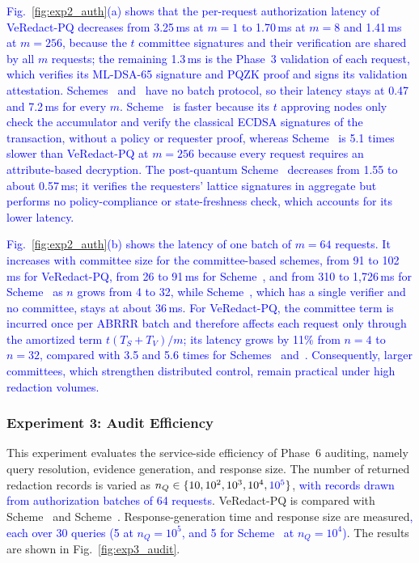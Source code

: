 \documentclass[lettersize,journal]{IEEEtran}
\newcommand{\chg}[1]{\textcolor{blue}{#1}}
\begin{document}
    \chg{Fig.~\ref{fig:exp2_auth}(a) shows that the per-request
    authorization latency of VeRedact-PQ decreases from 3.25\,ms at $m=1$
    to 1.70\,ms at $m=8$ and 1.41\,ms at $m=256$, because the $t$ committee
    signatures and their verification are shared by all $m$ requests; the
    remaining 1.3\,ms is the Phase~3 validation of each request, which
    verifies its ML-DSA-65 signature and PQZK proof and signs its validation
    attestation. Schemes~\cite{ref1} and~\cite{ref34} have no batch
    protocol, so their latency stays at 0.47 and 7.2\,ms for every $m$.
    Scheme~\cite{ref1} is faster because its $t$ approving nodes only check
    the accumulator and verify the classical ECDSA signatures of the
    transaction, without a policy or requester proof, whereas
    Scheme~\cite{ref34} is 5.1 times slower than VeRedact-PQ at $m=256$
    because every request requires an attribute-based decryption. The
    post-quantum Scheme~\cite{ref39} decreases from 1.55 to about 0.57\,ms;
    it verifies the requesters' lattice signatures in aggregate but performs
    no policy-compliance or state-freshness check, which accounts for its
    lower latency.}

    \chg{Fig.~\ref{fig:exp2_auth}(b) shows the latency of one batch of
    $m=64$ requests. It increases with committee size for the
    committee-based schemes, from 91 to 102\,ms for VeRedact-PQ, from 26 to
    91\,ms for Scheme~\cite{ref1}, and from 310 to 1{,}726\,ms for
    Scheme~\cite{ref34} as $n$ grows from 4 to 32, while
    Scheme~\cite{ref39}, which has a single verifier and no committee, stays
    at about 36\,ms. For VeRedact-PQ, the committee term is incurred once
    per ABRRR batch and therefore affects each request only through the
    amortized term $t(T_S+T_V)/m$; its latency grows by 11\% from $n=4$ to
    $n=32$, compared with 3.5 and 5.6 times for Schemes~\cite{ref1}
    and~\cite{ref34}. Consequently, larger committees, which strengthen
    distributed control, remain practical under high redaction volumes.}

    \subsubsection*{\textbf{Experiment 3: Audit Efficiency}}

    This experiment evaluates the service-side efficiency of Phase~6
    auditing, namely query resolution, evidence generation, and response
    size. The number of returned redaction records is varied as
    $n_Q\in\{10,10^2,10^3,10^4,\chg{10^5}\}$, \chg{with records drawn from
    authorization batches of 64 requests}. VeRedact-PQ is compared with
    Scheme~\cite{ref13} and Scheme~\cite{ref1}. Response-generation
    time and response size are measured\chg{, each over 30 queries (5 at $n_Q=10^5$, and 5 for
    Scheme~\cite{ref13} at $n_Q=10^4$)}. The results are shown in
    Fig.~\ref{fig:exp3_audit}.
\end{document}
